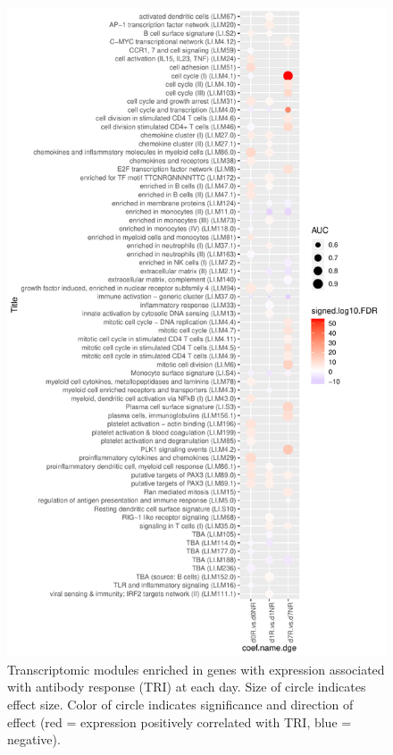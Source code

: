 \begin{figure}
    \includegraphics[width=1.0\textwidth]{mainmatter/figures/chapter_02/compare_dge_eqtl.tmodDotPlot.DGE.TRI.pdf}
    \caption{Transcriptomic modules enriched in genes with expression associated with antibody response (\gls{TRI}) at each day. Size of circle indicates effect size. Color of circle indicates significance and direction of effect (red = expression positively correlated with TRI, blue = negative).}
    \label{fig:hird_tmodDotPlot_TRI}
\end{figure}

